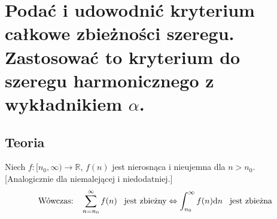\documentclass{article}
\numberwithin{equation}{section}
\theoremstyle{definition}
\theoremstyle{case}
\newcommand*{\R}{\mathbb{R}}
\let\iff\Leftrightarrow
\begin{document}
\section{Podać i udowodnić kryterium całkowe zbieżności szeregu. Zastosować to kryterium do szeregu harmonicznego z wykładnikiem \texorpdfstring{$ \alpha $}{a}.}
\subsection{Teoria}
Niech $f \colon [n_0,\infty) \to \R$, $f(n)$ jest nierosnąca i nieujemna dla $n> n_0$. %
[Analogicznie dla niemalejącej i niedodatniej.]
\begin{equation*}
	\textnormal{Wówczas: \enskip}
	\sum_{n={n_0}}^\infty f(n) \textnormal{ \enskip jest zbieżny}
	\iff
	\int_{n_0}^\infty f(n) \mathrm{d}n \textnormal{ \enskip jest zbieżna}
\end{equation*}
\end{document}

